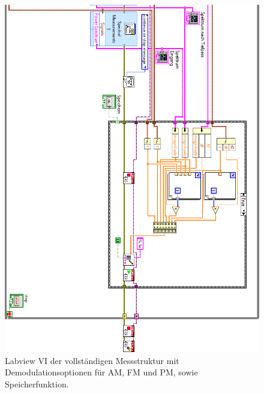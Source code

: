 	\begin{figure}[H]
		\centering
		\includegraphics[width=\textwidth]{pic/messstruktur_dafpm3.png}
		\caption{Labview VI der vollständigen Messstruktur mit Demodulationsoptionen für AM, FM und PM, sowie Speicherfunktion.}
		\label{fig:messstruktur_dafpm}	
	\end{figure} 
	
